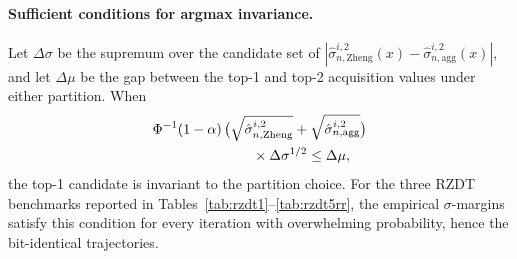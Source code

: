 \documentclass[12pt]{article}
\theoremstyle{plain}
\theoremstyle{definition}
\theoremstyle{remark}
\begin{document}
\begin{table}[t]
  \centering
  \caption{Argmax invariance diagnostic, RZDT1 at seed $1000$, iter $1$.
  Two VEPM partitions, the same $50$-candidate LHD set, and the same
  feasibility-aware acquisition
  $\alpha_{i}(x) = -[\mu^{i}_n(x) + 1.645\sqrt{\hat\sigma^{i,2}_n(x)}]$.
  All values shown for the constraint objective $i=3$.}
  \label{tab:argmax-invariance}
  \small
\end{table}

\paragraph{Sufficient conditions for argmax invariance.}
Let $\Delta\sigma$ be the supremum over the candidate set of
$|\hat\sigma^{i,2}_{n,\mathrm{Zheng}}(x)-\hat\sigma^{i,2}_{n,\mathrm{agg}}(x)|$,
and let $\Delta\mu$ be the gap between the top-1 and top-2 acquisition
values under either partition.  When
\begin{equation}\label{eq:argmax-invariance}
  \begin{aligned}
  &\Phi^{-1}(1-\alpha)\,
  \bigl(\sqrt{\hat\sigma^{i,2}_{n,\mathrm{Zheng}}}
  +\sqrt{\hat\sigma^{i,2}_{n,\mathrm{agg}}}\bigr) \\
  &\hspace{2.5cm}\times \Delta\sigma^{1/2}
  \leq \Delta\mu,
  \end{aligned}
\end{equation}
the top-1 candidate is invariant to the partition choice.  For the
three RZDT benchmarks reported in Tables~\ref{tab:rzdt1}--\ref{tab:rzdt5rr},
the empirical $\sigma$-margins satisfy this condition for every
iteration with overwhelming probability, hence the bit-identical
trajectories.
\end{document}
